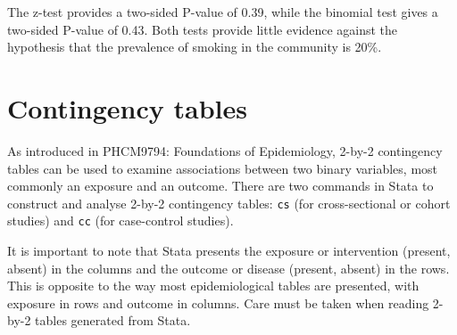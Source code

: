 \documentclass[
]{memoir}
\begin{document}
The z-test provides a two-sided P-value of 0.39, while the binomial test gives a two-sided P-value of 0.43. Both tests provide little evidence against the hypothesis that the prevalence of smoking in the community is 20\%.

\hypertarget{contingency-tables}{%
\section{Contingency tables}\label{contingency-tables}}

As introduced in PHCM9794: Foundations of Epidemiology, 2-by-2 contingency tables can be used to examine associations between two binary variables, most commonly an exposure and an outcome. There are two commands in Stata to construct and analyse 2-by-2 contingency tables: \texttt{cs} (for cross-sectional or cohort studies) and \texttt{cc} (for case-control studies).

It is important to note that Stata presents the exposure or intervention (present, absent) in the columns and the outcome or disease (present, absent) in the rows. This is opposite to the way most epidemiological tables are presented, with exposure in rows and outcome in columns. Care must be taken when reading 2-by-2 tables generated from Stata.

 
  \providecommand{\huxb}[2]{\arrayrulecolor[RGB]{#1}\global\arrayrulewidth=#2pt}
  \providecommand{\huxvb}[2]{\color[RGB]{#1}\vrule width #2pt}
  \providecommand{\huxtpad}[1]{\rule{0pt}{#1}}
  \providecommand{\huxbpad}[1]{\rule[-#1]{0pt}{#1}}
\end{document}
